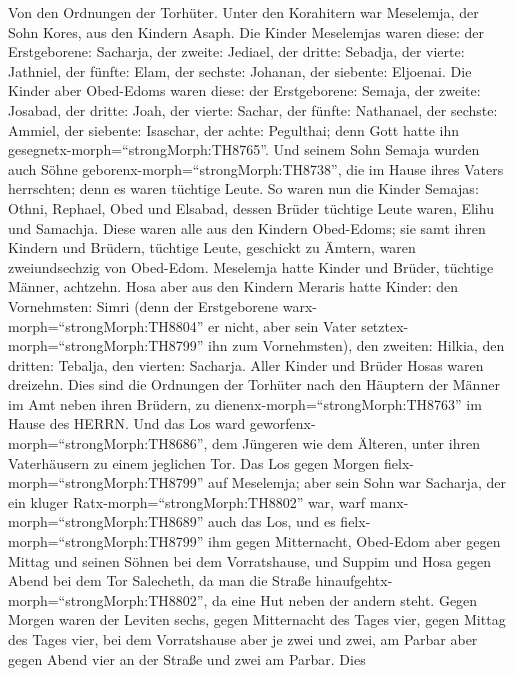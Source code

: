  Von den Ordnungen der Torhüter. Unter den Korahitern war
Meselemja, der Sohn Kores, aus den Kindern Asaph.  Die
Kinder Meselemjas waren diese: der Erstgeborene: Sacharja, der zweite:
Jediael, der dritte: Sebadja, der vierte: Jathniel,  der
fünfte: Elam, der sechste: Johanan, der siebente: Eljoenai. 
Die Kinder aber Obed-Edoms waren diese: der Erstgeborene: Semaja, der
zweite: Josabad, der dritte: Joah, der vierte: Sachar, der fünfte:
Nathanael,  der sechste: Ammiel, der siebente: Isaschar, der
achte: Pegulthai; denn Gott hatte ihn
gesegnetx-morph=``strongMorph:TH8765''.  Und seinem Sohn
Semaja wurden auch Söhne geborenx-morph=``strongMorph:TH8738'', die im
Hause ihres Vaters herrschten; denn es waren tüchtige Leute.
 So waren nun die Kinder Semajas: Othni, Rephael, Obed und
Elsabad, dessen Brüder tüchtige Leute waren, Elihu und Samachja.
 Diese waren alle aus den Kindern Obed-Edoms; sie samt ihren
Kindern und Brüdern, tüchtige Leute, geschickt zu Ämtern, waren
zweiundsechzig von Obed-Edom.  Meselemja hatte Kinder und
Brüder, tüchtige Männer, achtzehn.  Hosa aber aus den
Kindern Meraris hatte Kinder: den Vornehmsten: Simri (denn der
Erstgeborene warx-morph=``strongMorph:TH8804'' er nicht, aber sein Vater
setztex-morph=``strongMorph:TH8799'' ihn zum Vornehmsten), 
den zweiten: Hilkia, den dritten: Tebalja, den vierten: Sacharja. Aller
Kinder und Brüder Hosas waren dreizehn.  Dies sind die
Ordnungen der Torhüter nach den Häuptern der Männer im Amt neben ihren
Brüdern, zu dienenx-morph=``strongMorph:TH8763'' im Hause des HERRN.
 Und das Los ward geworfenx-morph=``strongMorph:TH8686'',
dem Jüngeren wie dem Älteren, unter ihren Vaterhäusern zu einem
jeglichen Tor.  Das Los gegen Morgen
fielx-morph=``strongMorph:TH8799'' auf Meselemja; aber sein Sohn war
Sacharja, der ein kluger Ratx-morph=``strongMorph:TH8802'' war, warf
manx-morph=``strongMorph:TH8689'' auch das Los, und es
fielx-morph=``strongMorph:TH8799'' ihm gegen Mitternacht, 
Obed-Edom aber gegen Mittag und seinen Söhnen bei dem Vorratshause,
 und Suppim und Hosa gegen Abend bei dem Tor Salecheth, da
man die Straße hinaufgehtx-morph=``strongMorph:TH8802'', da eine Hut
neben der andern steht.  Gegen Morgen waren der Leviten
sechs, gegen Mitternacht des Tages vier, gegen Mittag des Tages vier,
bei dem Vorratshause aber je zwei und zwei,  am Parbar aber
gegen Abend vier an der Straße und zwei am Parbar.  Dies
